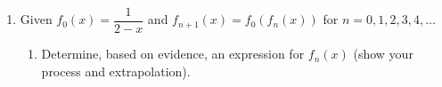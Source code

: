 \documentclass[12pt]{book}
\begin{document}
\begin{enumerate}
\textit{Conclusion:}\\
When all cases are gathered together and simplified, we have the following:\\

Case 1a and 1b: $x = -8, -\dfrac{16}{5}$\\\\
Case 2a: $x \in (-\infty, -8) \cup [4, \infty)$\\\\
Case 2b: $x \in \left(-\dfrac{16}{5}, 4\right)$

Combined answer: $x \in (-\infty, -8] \cup \left[-\dfrac{16}{5}, \infty\right)$\\

\textbf{Therefore:} $$x \in (-\infty, -8] \cup \left[-\dfrac{16}{5}, \infty\right)$$



\newpage

\item Given $f_0(x)=\dfrac{1}{2-x}$ and $f_{n+1}(x) = f_0(f_n(x))$ for $n=0,1,2,3,4,\ldots$

\begin{enumerate}
\item Determine, based on evidence, an expression for $f_n(x)$ (show your process and extrapolation).\\


\end{enumerate}
\end{enumerate}
\end{document}
